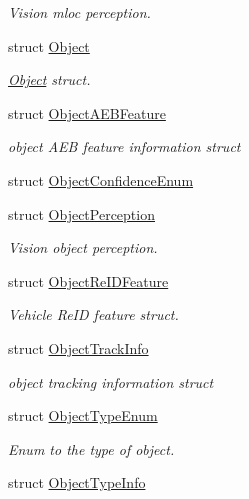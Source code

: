 \begin{DoxyCompactItemize}
\begin{DoxyCompactList}\small\item\em Vision mloc perception. \end{DoxyCompactList}\item 
struct \hyperlink{structmaf__perception__interface_1_1Object}{Object}
\begin{DoxyCompactList}\small\item\em \hyperlink{structmaf__perception__interface_1_1Object}{Object} struct. \end{DoxyCompactList}\item 
struct \hyperlink{structmaf__perception__interface_1_1ObjectAEBFeature}{Object\+A\+E\+B\+Feature}
\begin{DoxyCompactList}\small\item\em object A\+EB feature information struct \end{DoxyCompactList}\item 
struct \hyperlink{structmaf__perception__interface_1_1ObjectConfidenceEnum}{Object\+Confidence\+Enum}
\item 
struct \hyperlink{structmaf__perception__interface_1_1ObjectPerception}{Object\+Perception}
\begin{DoxyCompactList}\small\item\em Vision object perception. \end{DoxyCompactList}\item 
struct \hyperlink{structmaf__perception__interface_1_1ObjectReIDFeature}{Object\+Re\+I\+D\+Feature}
\begin{DoxyCompactList}\small\item\em Vehicle Re\+ID feature struct. \end{DoxyCompactList}\item 
struct \hyperlink{structmaf__perception__interface_1_1ObjectTrackInfo}{Object\+Track\+Info}
\begin{DoxyCompactList}\small\item\em object tracking information struct \end{DoxyCompactList}\item 
struct \hyperlink{structmaf__perception__interface_1_1ObjectTypeEnum}{Object\+Type\+Enum}
\begin{DoxyCompactList}\small\item\em Enum to the type of object. \end{DoxyCompactList}\item 
struct \hyperlink{structmaf__perception__interface_1_1ObjectTypeInfo}{Object\+Type\+Info}

\end{DoxyCompactItemize}
